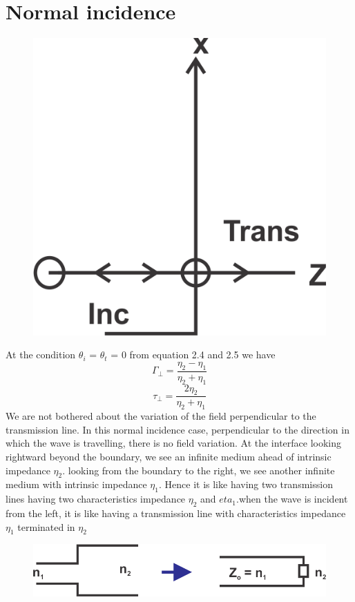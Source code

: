 \section{Normal incidence} 
\begin{figure}[h]
\centering
\includegraphics[scale=0.8]{./graphics/16}
\caption{}
\label{fig:16}
\end{figure}

At the condition $\theta_{i}$ = $\theta_{t}$ = 0 from equation 2.4 and 2.5 we have
\begin{equation}
\Gamma_{\perp} = \frac{\eta_{2} - \eta_{1}}{\eta_{2} + \eta_{1}}
\end{equation}
\begin{equation}
\tau_{\perp} = \frac{2 \eta_{2}}{\eta_{2} + \eta_{1}}
\end{equation}
We are not bothered about the variation of the field perpendicular to the transmission line. In this normal incidence case, perpendicular to the direction in which the wave is travelling, there is no field variation. At the interface looking rightward beyond the boundary, we see an infinite medium ahead of intrinsic impedance $\eta_{2}$. looking from the boundary to the right, we see another infinite medium with intrinsic impedance $\eta_{1}$. Hence it is like having two transmission lines having two characteristics impedance  $\eta_{2}$ and  $eta_{1}$.when the wave is incident from the left, it is like having a transmission  line with characteristics impedance  $\eta_{1}$ terminated in  $\eta_{2}$
\begin{figure}[h]
\centering
\includegraphics[width=.7\linewidth]{./graphics/17}
\caption{}
\label{fig:17}
\end{figure}

